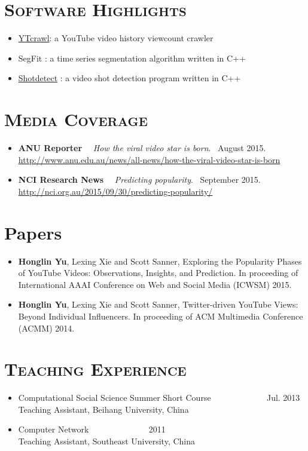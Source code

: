 \begin{resume}
\section{\textsc{Software Highlights}}
\begin{itemize}
\item \href{https://github.com/yuhonglin/YTCrawl}{YTcrawl}: a YouTube video history viewcount crawler
\item SegFit : a time series segmentation algorithm written in C++
\item \href{https://github.com/yuhonglin/shotdetect}{Shotdetect} : a video shot detection program written in C++
\end{itemize}

\section{\textsc{Media Coverage}}
\begin{itemize}
  \item {\bf ANU Reporter} \ \ {\it How the viral video star is born}. \ August 2015.\\
    \url{http://www.anu.edu.au/news/all-news/how-the-viral-video-star-is-born}
  \item {\bf NCI Research News} \ \ {\it Predicting popularity}. \ September 2015.\\
    \url{http://nci.org.au/2015/09/30/predicting-popularity/}
\end{itemize}


\section{Papers}
\begin{itemize}
\item {\bf Honglin Yu}, Lexing Xie and Scott Sanner, Exploring the Popularity Phases of YouTube Videos: Observations, Insights, and Prediction. In proceeding of International AAAI Conference on Web and Social Media (ICWSM) 2015.
\item {\bf Honglin Yu}, Lexing Xie and Scott Sanner, Twitter-driven YouTube Views: Beyond Individual Influencers. In proceeding of ACM Multimedia Conference (ACMM) 2014.  
\end{itemize} 



\section{\textsc{Teaching Experience}}
\begin{itemize}
  \item Computational Social Science Summer Short Course \ \ \ \ \ \ \ \ \  \ \ \ \hspace{3cm} Jul. 2013 \\
    Teaching Assistant, Beihang University, China
  \item Computer Network \ \ \ \ \ \ \ \ \ \ \ \ \ \hspace{9cm} 2011 \\
    Teaching Assistant, Southeast University, China
\end{itemize} 



\end{resume}
